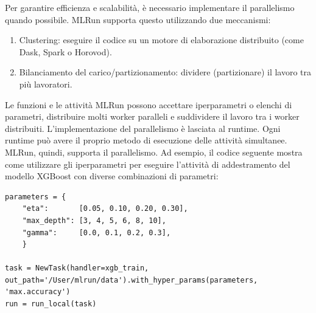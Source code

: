 \documentclass[12pt,a4paper]{report}
\begin{document}
Per garantire efficienza e scalabilità, è necessario implementare il parallelismo quando possibile. MLRun supporta questo utilizzando due meccanismi: \cite{MLRun}

\begin{enumerate}
    \item Clustering: eseguire il codice su un motore di elaborazione distribuito (come Dask, Spark o Horovod).
    \item Bilanciamento del carico/partizionamento: dividere (partizionare) il lavoro tra più lavoratori.
\end{enumerate}

Le funzioni e le attività MLRun possono accettare iperparametri o elenchi di parametri, distribuire molti worker paralleli e suddividere il lavoro tra i worker distribuiti. L'implementazione del parallelismo è lasciata al runtime. Ogni runtime può avere il proprio metodo di esecuzione delle attività simultanee.\\
MLRun, quindi, supporta il parallelismo. Ad esempio, il codice seguente mostra come utilizzare gli iperparametri per eseguire l'attività di addestramento del modello XGBoost con diverse combinazioni di parametri:
\\
\begin{lstlisting}[caption={Esempio di codice},captionpos=b, label={code:MLRun-code}]
parameters = {
    "eta":       [0.05, 0.10, 0.20, 0.30],
    "max_depth": [3, 4, 5, 6, 8, 10],
    "gamma":     [0.0, 0.1, 0.2, 0.3],
    }

task = NewTask(handler=xgb_train, out_path='/User/mlrun/data').with_hyper_params(parameters, 'max.accuracy')
run = run_local(task)
\end{lstlisting}
\end{document}
